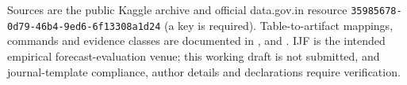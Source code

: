 Sources are the public Kaggle archive and official data.gov.in resource \texttt{35985678-}\allowbreak\texttt{0d79-}\allowbreak\texttt{46b4-}\allowbreak\texttt{9ed6-}\allowbreak\texttt{6f13308a1d24} (a key is required). Table-to-artifact mappings, commands and evidence classes are documented in ,  and . IJF is the intended empirical forecast-evaluation venue; this working draft is not submitted, and journal-template compliance, author details and declarations require verification.
